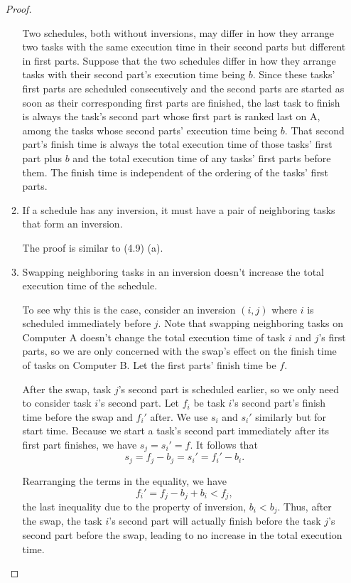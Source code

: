 \documentclass{article}
\begin{document}
\begin{enumerate}
\begin{proof}
\begin{enumerate}
        Two schedules, both without inversions, may differ in how they arrange two tasks with the same execution time in their second parts but different in first parts. Suppose that the two schedules differ in how they arrange tasks with their second part's execution time being $b$. Since these tasks' first parts are scheduled consecutively and the second parts are started as soon as their corresponding first parts are finished, the last task to finish is always the task's second part whose first part is ranked last on A, among the tasks whose second parts' execution time being $b$. That second part's finish time is always the total execution time of those tasks' first part plus $b$ and the total execution time of any tasks' first parts before them. The finish time is independent of the ordering of the tasks' first parts.

        \item If a schedule has any inversion, it must have a pair of neighboring tasks that form an inversion.
        
        The proof is similar to (4.9) (a).

        \item Swapping neighboring tasks in an inversion doesn't increase the total execution time of the schedule.
        
        To see why this is the case, consider an inversion $(i, j)$ where $i$ is scheduled immediately before $j$. Note that swapping neighboring tasks on Computer A doesn't change the total execution time of task $i$ and $j$'s first parts, so we are only concerned with the swap's effect on the finish time of tasks on Computer B. Let the first parts' finish time be $f$.

        After the swap, task $j$'s second part is scheduled earlier, so we only need to consider task $i$'s second part. Let $f_i$ be task $i$'s second part's finish time before the swap and $f_i'$ after. We use $s_i$ and $s_i'$ similarly but for start time. Because we start a task's second part immediately after its first part finishes, we have $s_j = s_i' = f$. It follows that
        $$
            s_j = f_j - b_j = s_i' = f_i' - b_i.
        $$

        Rearranging the terms in the equality, we have
        $$
            f_i' = f_j - b_j + b_i < f_j,
        $$
        the last inequality due to the property of inversion, $b_i < b_j$. Thus, after the swap, the task $i$'s second part will actually finish before the task $j$'s second part before the swap, leading to no increase in the total execution time.
    \end{enumerate}


\end{proof}
\end{enumerate}
\end{document}
